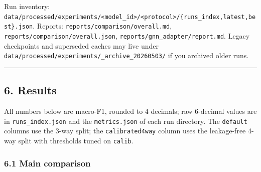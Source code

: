 \documentclass[
  11pt,
]{article}
\begin{document}
Run inventory:
\texttt{data/processed/experiments/\textless{}model\_id\textgreater{}/\textless{}protocol\textgreater{}/\{runs\_index,latest,best\}.json}.
Reports: \texttt{reports/comparison/overall.md},
\texttt{reports/comparison/overall.json},
\texttt{reports/gnn\_adapter/report.md}. Legacy checkpoints and
superseded caches may live under
\texttt{data/processed/experiments/\_archive\_20260503/} if you archived
older runs.

\begin{center}\rule{0.5\linewidth}{0.5pt}\end{center}

\subsection{6. Results}\label{results}

All numbers below are macro-F1, rounded to 4 decimals; raw 6-decimal
values are in \texttt{runs\_index.json} and the \texttt{metrics.json} of
each run directory. The \texttt{default} columns use the 3-way split;
the \texttt{calibrated4way} column uses the leakage-free 4-way split
with thresholds tuned on \texttt{calib}.

\subsubsection{6.1 Main comparison}\label{main-comparison}
\end{document}
